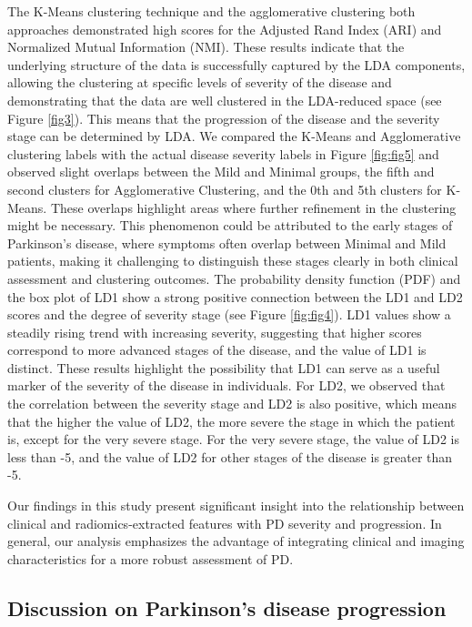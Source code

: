 \documentclass[twocolumn]{article}
\begin{document}
The K-Means clustering technique and the agglomerative clustering both approaches demonstrated high scores for the Adjusted Rand Index (ARI) and Normalized Mutual Information (NMI). These results indicate that the underlying structure of the data is successfully captured by the LDA components, allowing the clustering at specific levels of severity of the disease and demonstrating that the data are well clustered in the LDA-reduced space (see Figure \ref{fig3}). This means that the progression of the disease and the severity stage can be determined by LDA. We compared the K-Means and Agglomerative clustering labels with the actual disease severity labels in Figure \ref{fig:fig5} and observed slight overlaps between the Mild and Minimal groups, the fifth and second clusters for Agglomerative Clustering, and the 0th and 5th clusters for K-Means. These overlaps highlight areas where further refinement in the clustering might be necessary. This phenomenon could be attributed to the early stages of Parkinson's disease, where symptoms often overlap between Minimal and Mild patients, making it challenging to distinguish these stages clearly in both clinical assessment and clustering outcomes. The probability density function (PDF) and the box plot of LD1 show a strong positive connection between the LD1 and LD2 scores and the degree of severity stage (see Figure \ref{fig:fig4}). LD1 values show a steadily rising trend with increasing severity, suggesting that higher scores correspond to more advanced stages of the disease, and the value of LD1 is distinct. These results highlight the possibility that LD1 can serve as a useful marker of the severity of the disease in individuals. For LD2, we observed that the correlation between the severity stage and LD2 is also positive, which means that the higher the value of LD2, the more severe the stage in which the patient is, except for the very severe stage. For the very severe stage, the value of LD2 is less than -5, and the value of LD2 for other stages of the disease is greater than -5.

Our findings in this study present significant insight into the relationship between clinical and radiomics-extracted features with PD severity and progression. In general, our analysis emphasizes the advantage of integrating clinical and imaging characteristics for a more robust assessment of PD.


\subsection{Discussion on Parkinson’s disease progression}
\end{document}
